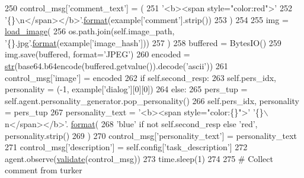 \begin{DoxyCode}
250                 control\_msg[\textcolor{stringliteral}{'comment\_text'}] = (
251                     \textcolor{stringliteral}{'<b><span style="color:red">'}
252                     \textcolor{stringliteral}{'\{\}\(\backslash\)n</span></b>'}.\hyperlink{namespaceparlai_1_1chat__service_1_1services_1_1messenger_1_1shared__utils_a32e2e2022b824fbaf80c747160b52a76}{format}(example[\textcolor{stringliteral}{'comment'}].strip())
253                 )
254 
255             img = \hyperlink{namespacepersonality__captions_1_1worlds_a2863737d97a8e8c5a1ebe9029d0d2293}{load\_image}(
256                 os.path.join(self.image\_path, \textcolor{stringliteral}{'\{\}.jpg'}.\hyperlink{namespaceparlai_1_1chat__service_1_1services_1_1messenger_1_1shared__utils_a32e2e2022b824fbaf80c747160b52a76}{format}(example[\textcolor{stringliteral}{'image\_hash'}]))
257             )
258             buffered = BytesIO()
259             img.save(buffered, format=\textcolor{stringliteral}{'JPEG'})
260             encoded = \hyperlink{namespacegenerate__task__READMEs_a5b88452ffb87b78c8c85ececebafc09f}{str}(base64.b64encode(buffered.getvalue()).decode(\textcolor{stringliteral}{'ascii'}))
261             control\_msg[\textcolor{stringliteral}{'image'}] = encoded
262             \textcolor{keywordflow}{if} self.second\_resp:
263                 self.pers\_idx, personality = (-1, example[\textcolor{stringliteral}{'dialog'}][0][0])
264             \textcolor{keywordflow}{else}:
265                 pers\_tup = self.agent.personality\_generator.pop\_personality()
266                 self.pers\_idx, personality = pers\_tup
267             personality\_text = \textcolor{stringliteral}{'<b><span style="color:\{\}">'} \textcolor{stringliteral}{'\{\}\(\backslash\)n</span></b>'}.
      \hyperlink{namespaceparlai_1_1chat__service_1_1services_1_1messenger_1_1shared__utils_a32e2e2022b824fbaf80c747160b52a76}{format}(
268                 \textcolor{stringliteral}{'blue'} \textcolor{keywordflow}{if} \textcolor{keywordflow}{not} self.second\_resp \textcolor{keywordflow}{else} \textcolor{stringliteral}{'red'}, personality.strip()
269             )
270             control\_msg[\textcolor{stringliteral}{'personality\_text'}] = personality\_text
271             control\_msg[\textcolor{stringliteral}{'description'}] = self.config[\textcolor{stringliteral}{'task\_description'}]
272             agent.observe(\hyperlink{namespaceparlai_1_1core_1_1worlds_afc3fad603b7bce41dbdc9cdc04a9c794}{validate}(control\_msg))
273             time.sleep(1)
274 
275             \textcolor{comment}{# Collect comment from turker}

\end{DoxyCode}
